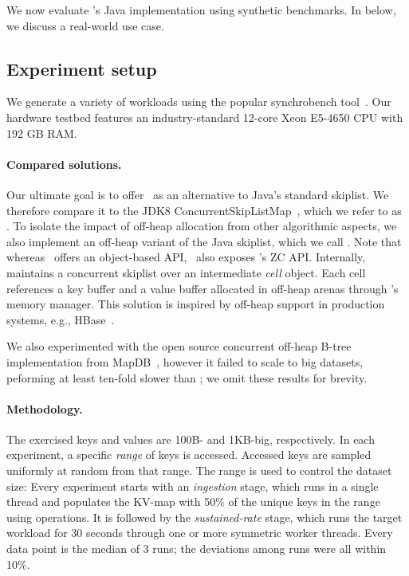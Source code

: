 \label{sec:eval}

We now evaluate   \oak's Java  implementation using synthetic benchmarks.
In  below, we discuss a real-world use case.

\subsection{Experiment setup} 

We generate a variety of workloads
using the popular synchrobench  tool~\cite{synchrobench}.
Our hardware testbed features an industry-standard 12-core Xeon E5-4650 CPU with 192 GB RAM. 

\paragraph{Compared solutions.} 
Our ultimate goal is to offer \oak\ as an alternative to Java's standard skiplist. 
We therefore compare it to the JDK8 ConcurrentSkipListMap~\cite{JavaSkipList},
which we refer to as \csl.  
%
To isolate the impact of off-heap allocation from other algorithmic aspects, 
we also implement  an off-heap variant of the Java skiplist, which we call \YoniList.
Note that whereas \csl\ offers an object-based API, \YoniList\ also exposes \oak's ZC API. 
Internally, \YoniList\/ 
maintains a concurrent skiplist over an intermediate {\em cell\/} object. Each cell references a key buffer 
and a value buffer allocated in off-heap arenas  through \oak's memory manager. 
This solution is inspired by off-heap support  in production systems, e.g., HBase~\cite{HbaseOffheapWritePath}. 

{We also experimented with the open source concurrent off-heap B-tree implementation from MapDB~\cite{MapDB}, 
however it failed to scale to big datasets, peforming at least ten-fold slower than \oak; we omit these results for brevity.}

\paragraph{Methodology.}
The exercised keys and values are 100B- and 1KB-big, respectively. 
In each experiment, a specific \emph{range} of keys is accessed. 
Accessed keys are sampled  uniformly at random from that range. 
The range is used to control the dataset size:
Every experiment starts with an {\em ingestion\/} 
stage, which runs in a single thread and populates the KV-map with 50\% of the unique keys in the range 
using  operations. It is followed by the {\em sustained-rate\/} stage, 
which runs the target workload for 30 seconds through one or more symmetric worker threads. 
%
Every data point is the median of 3 runs; {the deviations among runs were all within 10\%}.

